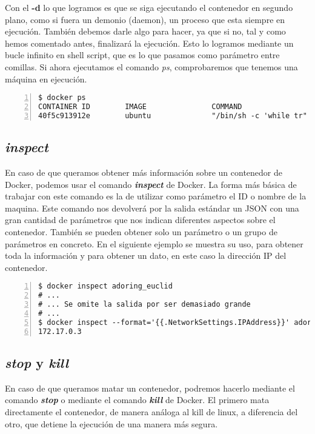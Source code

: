 	Con el \textbf{-d} lo que logramos es que se siga ejecutando el contenedor en segundo plano, como si fuera un demonio (daemon), un proceso que esta siempre en ejecución. También debemos darle algo para hacer, ya que si no, tal y como hemos comentado antes, finalizará la ejecución. Esto lo logramos mediante un bucle infinito en shell script, que es lo que pasamos como parámetro entre comillas. Si ahora ejecutamos el comando \emph{ps}, comprobaremos que tenemos una máquina en ejecución.
	
	\begin{lstlisting}[style=consola,numbers=left]
$ docker ps
CONTAINER ID        IMAGE               COMMAND                  CREATED             STATUS              PORTS               NAMES
40f5c913912e        ubuntu              "/bin/sh -c 'while tr"   2 seconds ago       Up 2 seconds                            adoring_euclid
	\end{lstlisting}
	
	\subsection{\textit{inspect}}
	En caso de que queramos obtener más información sobre un contenedor de Docker, podemos usar el comando \textbf{\emph{inspect}} de Docker. La forma más básica de trabajar con este comando es la de utilizar como parámetro el ID o nombre de la maquina. Este comando nos devolverá por la salida estándar un JSON con una gran cantidad de parámetros que nos indican diferentes aspectos sobre el contenedor. También se pueden obtener solo un parámetro o un grupo de parámetros en concreto. En el siguiente ejemplo se muestra su uso, para obtener toda la información y para obtener un dato, en este caso la dirección IP del contenedor.
	
	\begin{lstlisting}[style=consola,numbers=left]
$ docker inspect adoring_euclid
# ...
# ... Se omite la salida por ser demasiado grande
# ...
$ docker inspect --format='{{.NetworkSettings.IPAddress}}' adoring_euclid
172.17.0.3
	\end{lstlisting}

	\subsection{\textit{stop} y \textit{kill}}
	En caso de que queramos matar un contenedor, podremos hacerlo mediante el comando \textbf{\emph{stop}} o mediante el comando \textbf{\emph{kill}} de Docker. El primero mata directamente el contenedor, de manera análoga al kill de linux, a diferencia del otro, que detiene la ejecución de una manera más segura.
	
